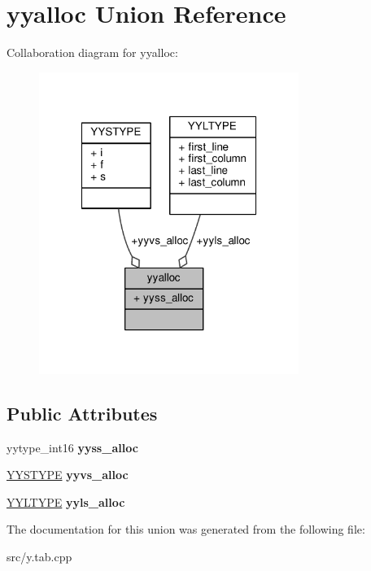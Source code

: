 \hypertarget{unionyyalloc}{\section{yyalloc Union Reference}
\label{unionyyalloc}
}


Collaboration diagram for yyalloc\-:
\nopagebreak
\begin{figure}[H]
\begin{center}
\leavevmode
\includegraphics[width=239pt]{unionyyalloc__coll__graph}
\end{center}
\end{figure}
\subsection*{Public Attributes}
\begin{DoxyCompactItemize}
\item 
\hypertarget{unionyyalloc_a4800e0520a89a4789afa7b5d82197e65}{yytype\-\_\-int16 {\bfseries yyss\-\_\-alloc}}\label{unionyyalloc_a4800e0520a89a4789afa7b5d82197e65}

\item 
\hypertarget{unionyyalloc_a9326f4fdc6f737a929444427836d8928}{\hyperlink{union_y_y_s_t_y_p_e}{Y\-Y\-S\-T\-Y\-P\-E} {\bfseries yyvs\-\_\-alloc}}\label{unionyyalloc_a9326f4fdc6f737a929444427836d8928}

\item 
\hypertarget{unionyyalloc_a542e43248e6afac9af342c2f4e3162fc}{\hyperlink{struct_y_y_l_t_y_p_e}{Y\-Y\-L\-T\-Y\-P\-E} {\bfseries yyls\-\_\-alloc}}\label{unionyyalloc_a542e43248e6afac9af342c2f4e3162fc}

\end{DoxyCompactItemize}


The documentation for this union was generated from the following file\-:\begin{DoxyCompactItemize}
\item 
src/y.\-tab.\-cpp\end{DoxyCompactItemize}
